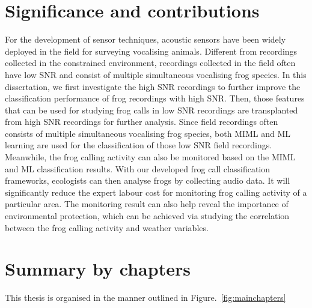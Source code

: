 \section{Significance and contributions}
For the development of sensor techniques, acoustic sensors have been widely deployed in the field for surveying vocalising animals. Different from recordings collected in the constrained environment, recordings collected in the field often have low SNR and consist of multiple simultaneous vocalising frog species. In this dissertation, we first investigate the high SNR recordings to further improve the classification performance of frog recordings with high SNR. 
Then, those features that can be used for studying frog calls in low SNR recordings are transplanted from high SNR recordings for further analysis.
Since field recordings often consists of multiple simultaneous vocalising frog species, both MIML and ML learning are used for the classification of those low SNR field recordings. Meanwhile, the frog calling activity can also be monitored based on the MIML and ML classification results.
With our developed frog call classification frameworks, ecologists can then analyse frogs by collecting audio data. It will significantly reduce the expert labour cost for monitoring frog calling activity of a particular area. The monitoring result can also help reveal the importance of environmental protection, which can be achieved via studying the correlation between the frog calling activity and weather variables. 

 
 
\section{Summary by chapters} 
 
This thesis is organised in the manner outlined in Figure.~\ref{fig:mainchapters}


